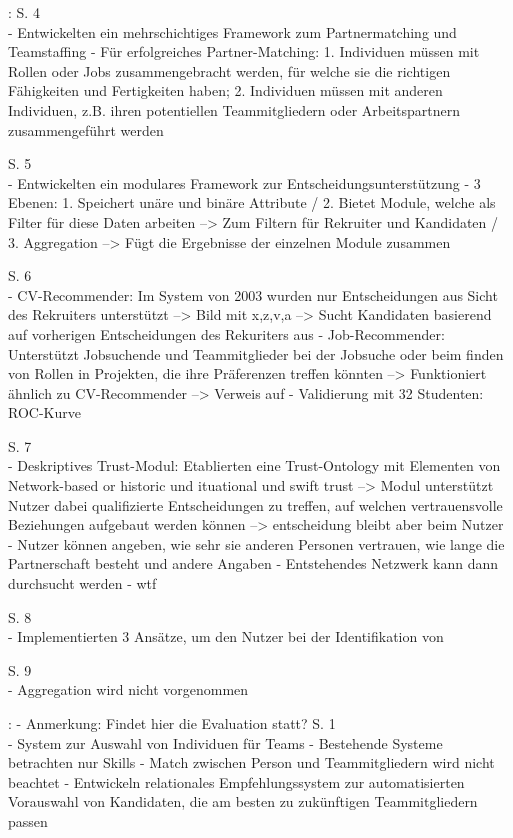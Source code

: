 \newpage
\textcite{keim:2007}:
S. 4\\
- Entwickelten ein mehrschichtiges Framework zum Partnermatching und Teamstaffing
- Für erfolgreiches Partner-Matching: 1. Individuen müssen mit Rollen oder Jobs zusammengebracht werden, für welche sie die richtigen Fähigkeiten und Fertigkeiten haben; 2. Individuen müssen mit anderen Individuen, z.B. ihren potentiellen Teammitgliedern oder Arbeitspartnern zusammengeführt werden

S. 5\\
- Entwickelten ein modulares Framework zur Entscheidungsunterstützung
- 3 Ebenen: 1. Speichert unäre und binäre Attribute / 2. Bietet Module, welche als Filter für diese Daten arbeiten --> Zum Filtern für Rekruiter und Kandidaten / 3. Aggregation --> Fügt die Ergebnisse der einzelnen Module zusammen

S. 6\\
- CV-Recommender: Im System von 2003 wurden nur Entscheidungen aus Sicht des Rekruiters unterstützt --> Bild mit x,z,v,a --> Sucht Kandidaten basierend auf vorherigen Entscheidungen des Rekuriters aus
- Job-Recommender: Unterstützt Jobsuchende und Teammitglieder bei der Jobsuche oder beim finden von Rollen in Projekten, die ihre Präferenzen treffen könnten --> Funktioniert ähnlich zu CV-Recommender --> Verweis auf \textcite{malinowski:2006}
- Validierung mit 32 Studenten: ROC-Kurve

S. 7\\
- Deskriptives Trust-Modul: Etablierten eine Trust-Ontology mit Elementen von Network-based or historic und ituational und swift trust --> Modul unterstützt Nutzer dabei qualifizierte Entscheidungen zu treffen, auf welchen vertrauensvolle Beziehungen aufgebaut werden können --> entscheidung bleibt aber beim Nutzer
- Nutzer können angeben, wie sehr sie anderen Personen vertrauen, wie lange die Partnerschaft besteht und andere Angaben
- Entstehendes Netzwerk kann dann durchsucht werden
- wtf

S. 8\\
- Implementierten 3 Ansätze, um den Nutzer bei der Identifikation von 

S. 9\\
- Aggregation wird nicht vorgenommen

\textcite{malinowski:2008}:
- Anmerkung: Findet hier die Evaluation statt?
S. 1\\
- System zur Auswahl von Individuen für Teams
- Bestehende Systeme betrachten nur Skills - Match zwischen Person und Teammitgliedern wird nicht beachtet
- Entwickeln relationales Empfehlungssystem zur automatisierten Vorauswahl von Kandidaten, die am besten zu zukünftigen Teammitgliedern passen

